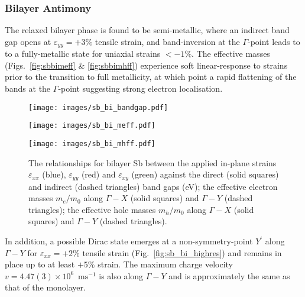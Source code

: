 \subsubsection{Bilayer Antimony}
The relaxed bilayer phase 
is found to be semi-metallic, 
where an indirect band gap 
opens at $\varepsilon_{yy}=+3\%$
tensile strain, 
and band-inversion at the $\Gamma$-point 
leads to to a 
fully-metallic state for 
uniaxial strains $<-1\%$.
%
The effective masses  
(Figs.~\ref{fig:sbbimeff} \& \ref{fig:sbbimhff})
experience soft linear-response to strains 
prior to the transition to full metallicity, 
at which point a rapid flattening of the bands at the 
$\Gamma$-point suggesting strong electron localisation.

\begin{figure}[th!]
\begin{subfloat}{
\texttt{[image: images/sb\_bi\_bandgap.pdf]}
  \label{fig:sbbibg}}
\end{subfloat}
%
\begin{subfloat}[Bilayer Sb $m_e/m_0$]{
\texttt{[image: images/sb\_bi\_meff.pdf]}
  \label{fig:sbbimeff}}
\end{subfloat}
%
\begin{subfloat}[Bilayer Sb $m_h/m_0$]{
\texttt{[image: images/sb\_bi\_mhff.pdf]}
  \label{fig:sbbimhff}}
\end{subfloat}
%
\caption[Electronic properties of antimony for in-plane strains]
{The relationships for bilayer Sb between 
the applied in-plane strains $\varepsilon_{xx}$ (blue),
$\varepsilon_{yy}$ (red) and $\varepsilon_{xy}$ (green) against 
%
\protect{}
the direct (solid  squares) and indirect 
(dashed triangles) band gaps (eV);
%
\protect{}
the effective electron masses $m_e/m_0$ 
along $\Gamma-X$ (solid squares) and 
$\Gamma-Y$ (dashed triangles);
%
\protect{}
the effective hole masses $m_h/m_0$ 
along $\Gamma-X$ (solid squares) and 
$\Gamma-Y$ (dashed triangles).}
\label{fig:sb_elec_properties}
\end{figure}
%


In addition, a possible Dirac {state} emerges 
at a non-symmetry-point 
$Y^\prime$ along $\Gamma-Y$ 
for $\varepsilon_{xx}=+2\%$ 
tensile strain 
(Fig.~\ref{fig:sb_bi_highres})
and remains in place 
up to at least $+5\%$ strain.
%
The maximum charge velocity 
$v=4.47(3)\times10^6$~$\textrm{ms}^{-1}$ 
is also along $\Gamma-Y$ 
and is approximately 
the same as that of the monolayer.

